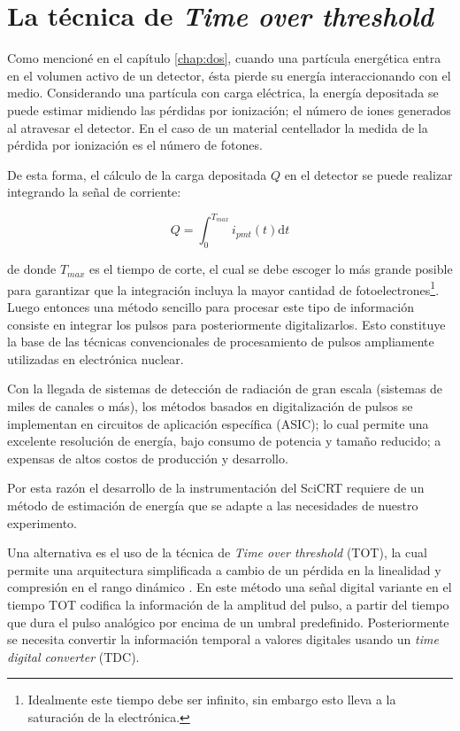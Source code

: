 \section{La técnica de \emph{Time over threshold}}
\label{sec:time-over}

Como mencioné en el capítulo \ref{chap:dos}, cuando una partícula energética entra en el volumen activo de un detector, ésta pierde su energía interaccionando con el medio. Considerando una partícula con carga eléctrica, la energía depositada se puede estimar midiendo las pérdidas por ionización; el número de iones generados al atravesar el detector. En el caso de un material centellador la medida de la pérdida por ionización es el número de fotones.

De esta forma, el cálculo de la carga depositada $Q$ en el detector se puede realizar integrando la señal de corriente:

\begin{equation}
\label{equ:charge}
Q=\int_{0}^{T_{max}} i_{pmt}\left(t\right)\mathrm{d}t
\end{equation}

de donde $T_{max}$ es el tiempo de corte, el cual se debe escoger lo más grande posible para garantizar que la integración incluya la mayor cantidad de fotoelectrones\footnote{Idealmente este tiempo debe ser infinito, sin embargo esto lleva a la saturación de la electrónica.}. Luego entonces una método sencillo para procesar este tipo de información consiste en integrar los pulsos para posteriormente digitalizarlos. Esto constituye la base de las técnicas convencionales de procesamiento de pulsos ampliamente utilizadas en electrónica nuclear.

Con la llegada de sistemas de detección de radiación de gran escala (sistemas de miles de canales o más), los métodos basados en digitalización de pulsos se implementan en circuitos de aplicación específica (ASIC); lo cual permite una excelente resolución de energía, bajo consumo de potencia y tamaño reducido; a expensas de altos costos de producción y desarrollo.

Por esta razón el desarrollo de la instrumentación del SciCRT requiere de un método de estimación de energía que se adapte a las necesidades de nuestro experimento.

Una alternativa es el uso de la técnica de \emph{Time over threshold} (TOT), la cual permite una arquitectura simplificada a cambio de un pérdida en la linealidad y compresión en el rango dinámico \cite{fujiwara10}. En este método una señal digital variante en el tiempo TOT codifica la información de la amplitud del pulso, a partir del tiempo que dura el pulso analógico por encima de un umbral predefinido. Posteriormente se necesita convertir la información temporal a valores digitales usando un \emph{time digital converter} (TDC).

